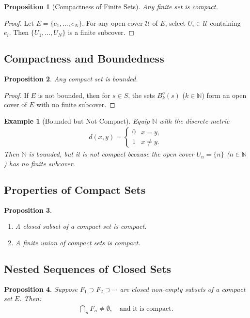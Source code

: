 \documentclass[9pt]{article}
\theoremstyle{definition}
\theoremstyle{plain}
\newtheorem{proposition}{Proposition}
\newtheorem{example}{Example}
\begin{document}
\begin{proposition}[Compactness of Finite Sets]
Any finite set is compact.
\end{proposition}
\begin{proof}
Let $ E = \{e_1, \ldots, e_N\} $. For any open cover $ \mathcal{U} $ of $ E $, select $ U_i \in \mathcal{U} $ containing $ e_i $. Then $ \{U_1, \ldots, U_N\} $ is a finite subcover.
\end{proof}

\subsection*{Compactness and Boundedness}
\begin{proposition}
Any compact set is bounded.
\end{proposition}
\begin{proof}
If $ E $ is not bounded, then for $ s \in S $, the sets $ B_k^o(s) $ ($ k \in \mathbb{N} $) form an open cover of $ E $ with no finite subcover.
\end{proof}

\begin{example}[Bounded but Not Compact]
Equip $ \mathbb{N} $ with the discrete metric 
\begin{align}
     d(x, y) = 
\begin{cases} 
0 & x = y, \\
1 & x \neq y.
\end{cases} 
\end{align}
Then $ \mathbb{N} $ is bounded, but it is not compact because the open cover $ U_n = \{n\} $ ($ n \in \mathbb{N} $) has no finite subcover.
\end{example}

\subsection*{Properties of Compact Sets}
\begin{proposition}

\begin{enumerate}
    \item A closed subset of a compact set is compact.
    \item A finite union of compact sets is compact.
\end{enumerate}
\end{proposition}

\subsection*{Nested Sequences of Closed Sets}
\begin{proposition}
Suppose $ F_1 \supset F_2 \supset \cdots $ are closed non-empty subsets of a compact set $ E $. Then:
\begin{align}
\bigcap_{n} F_n \neq \emptyset, \quad \text{and it is compact.}
\end{align}
\end{proposition}
\end{document}

